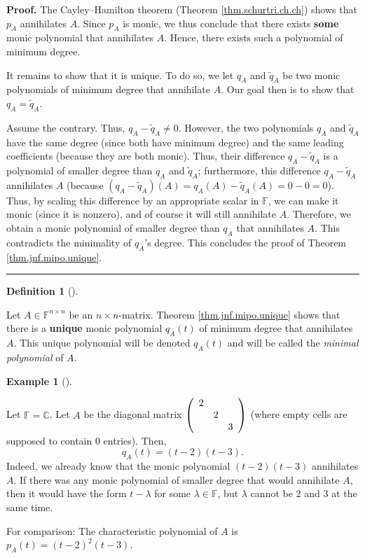 \documentclass[numbers=enddot,12pt,final,onecolumn,notitlepage]{scrartcl}%
\numberwithin{exer}{subsection}
\theoremstyle{definition}
\newtheorem{defi}[theo]{Definition}
\newenvironment{definition}[1][]
{\begin{defi}[#1]\begin{leftbar}}
{\end{leftbar}\end{defi}}
\newtheorem{exam}[theo]{Example}
\newenvironment{example}[1][]
{\begin{exam}[#1]\begin{leftbar}}
{\end{leftbar}\end{exam}}
\newenvironment{proof}[1][Proof]{\noindent\textbf{#1.} }{\ \rule{0.5em}{0.5em}}
\begin{document}
\begin{proof}
The Cayley--Hamilton theorem (Theorem \ref{thm.schurtri.ch.ch}) shows that
$p_{A}$ annihilates $A$. Since $p_{A}$ is monic, we thus conclude that there
exists \textbf{some} monic polynomial that annihilates $A$. Hence, there
exists such a polynomial of minimum degree.

It remains to show that it is unique. To do so, we let $q_{A}$ and
$\widetilde{q}_{A}$ be two monic polynomials of minimum degree that annihilate
$A$. Our goal then is to show that $q_{A}=\widetilde{q}_{A}$.

Assume the contrary. Thus, $q_{A}-\widetilde{q}_{A}\neq0$. However, the two
polynomials $q_{A}$ and $\widetilde{q}_{A}$ have the same degree (since both
have minimum degree) and the same leading coefficients (because they are both
monic). Thus, their difference $q_{A}-\widetilde{q}_{A}$ is a polynomial of
smaller degree than $q_{A}$ and $\widetilde{q}_{A}$; furthermore, this
difference $q_{A}-\widetilde{q}_{A}$ annihilates $A$ (because $\left(
q_{A}-\widetilde{q}_{A}\right)  \left(  A\right)  =q_{A}\left(  A\right)
-\widetilde{q}_{A}\left(  A\right)  =0-0=0$). Thus, by scaling this difference
by an appropriate scalar in $\mathbb{F}$, we can make it monic (since it is
nonzero), and of course it will still annihilate $A$. Therefore, we obtain a
monic polynomial of smaller degree than $q_{A}$ that annihilates $A$. This
contradicts the minimality of $q_{A}$'s degree. This concludes the proof of
Theorem \ref{thm.jnf.mipo.unique}.
\end{proof}

\begin{definition}
\label{def.jnf.mipo.mipo}Let $A\in\mathbb{F}^{n\times n}$ be an $n\times
n$-matrix. Theorem \ref{thm.jnf.mipo.unique} shows that there is a
\textbf{unique} monic polynomial $q_{A}\left(  t\right)  $ of minimum degree
that annihilates $A$. This unique polynomial will be denoted $q_{A}\left(
t\right)  $ and will be called the \emph{minimal polynomial} of $A$.
\end{definition}

\begin{example}
Let $\mathbb{F}=\mathbb{C}$. Let $A$ be the diagonal matrix $\left(
\begin{array}
[c]{ccc}%
2 &  & \\
& 2 & \\
&  & 3
\end{array}
\right)  $ (where empty cells are supposed to contain $0$ entries). Then,%
\[
q_{A}\left(  t\right)  =\left(  t-2\right)  \left(  t-3\right)  .
\]
Indeed, we already know that the monic polynomial $\left(  t-2\right)  \left(
t-3\right)  $ annihilates $A$. If there was any monic polynomial of smaller
degree that would annihilate $A$, then it would have the form $t-\lambda$ for
some $\lambda\in\mathbb{F}$, but $\lambda$ cannot be $2$ and $3$ at the same time.

For comparison: The characteristic polynomial of $A$ is $p_{A}\left(
t\right)  =\left(  t-2\right)  ^{2}\left(  t-3\right)  $.
\end{example}
\end{document}
